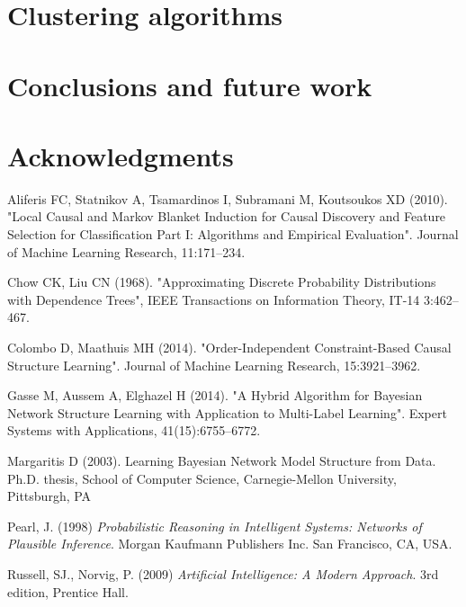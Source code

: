\documentclass[a4paper,11pt]{article}
\begin{document}
\section{Clustering algorithms}

\section{Conclusions and future work}

\section{Acknowledgments}



\begin{thebibliography}{}

Aliferis FC, Statnikov A, Tsamardinos I, Subramani M, Koutsoukos XD (2010). "Local Causal and Markov Blanket Induction for Causal Discovery and Feature Selection for Classification Part I: Algorithms and Empirical Evaluation". Journal of Machine Learning Research, 11:171–234.

Chow CK, Liu CN (1968). "Approximating Discrete Probability Distributions with Dependence Trees", IEEE Transactions on Information Theory, IT-14 3:462–467.

Colombo D, Maathuis MH (2014). "Order-Independent Constraint-Based Causal Structure Learning". Journal of Machine Learning Research, 15:3921–3962.

Gasse M, Aussem A, Elghazel H (2014). "A Hybrid Algorithm for Bayesian Network Structure Learning with Application to Multi-Label Learning". Expert Systems with Applications, 41(15):6755–6772.

Margaritis D (2003). Learning Bayesian Network Model Structure from Data. Ph.D. thesis, School of Computer Science, Carnegie-Mellon University, Pittsburgh, PA

Pearl, J. (1998) \textit{Probabilistic Reasoning in Intelligent Systems: Networks of Plausible Inference}. Morgan Kaufmann Publishers Inc. San Francisco, CA, USA.

Russell, SJ., Norvig, P. (2009) \textit{Artificial Intelligence: A Modern Approach}. 3rd edition, Prentice Hall.


\end{thebibliography}
\end{document}
